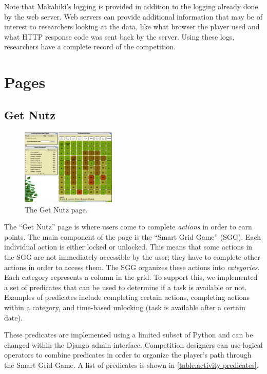 Note that Makahiki's logging is provided in addition to the logging already done by the web server. Web servers can provide additional information that may be of interest to researchers looking at the data, like what browser the player used and what HTTP response code was sent back by the server.  Using these logs, researchers have a complete record of the competition.

\section{Pages}

\subsection{Get Nutz}
\label{makahiki:pages-getnutz}

\begin{figure}[h]
  \center
  \includegraphics[width=0.4\textwidth]{images/getnutz.eps}
  \caption{The Get Nutz page.}
  \label{fig:get-nutz-page}
\end{figure}

The ``Get Nutz'' page is where users come to complete \emph{actions} in order to earn points.  The main component of the page is the ``Smart Grid Game'' (SGG).  Each individual action is either locked or unlocked.  This means that some actions in the SGG are not immediately accessible by the user; they have to complete other actions in order to access them.  The SGG organizes these actions into \emph{categories}. Each category represents a column in the grid. To support this, we implemented a set of predicates that can be used to determine if a task is available or not. Examples of predicates include completing certain actions, completing actions within a category, and time-based unlocking (task is available after a certain date).

These predicates are implemented using a limited subset of Python and can be changed within the Django admin interface. Competition designers can use logical operators to combine predicates in order to organize the player's path through the Smart Grid Game. A list of predicates is shown in \autoref{table:activity-predicates}.


